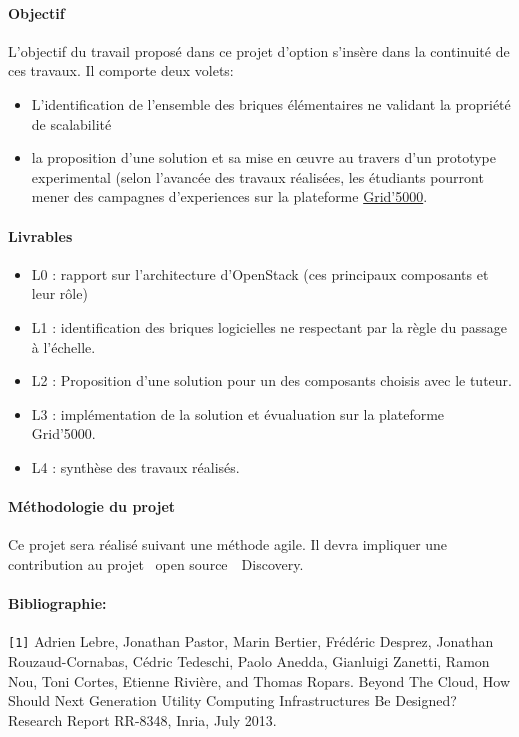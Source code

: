 \documentclass[a4paper,11pt]{article}
\begin{document}
\begin{note}
\paragraph*{Objectif\\}

  L'objectif du travail proposé dans ce projet d'option s'insère dans
  la continuité de ces travaux. Il comporte deux
  volets:
\begin{itemize}
\item L'identification de l'ensemble des briques élémentaires ne
  validant la propriété de scalabilité
\item la proposition d'une solution et sa mise en \oe uvre au travers
  d'un prototype experimental (selon l'avancée des travaux réalisées,
  les étudiants pourront mener des campagnes d'experiences sur la
  plateforme \href{Grid'5000}{Grid'5000}.
\end{itemize}

\paragraph*{Livrables\\}

\begin{itemize}
\item L0 : rapport sur l'architecture d'OpenStack (ces principaux
  composants et leur rôle)
\item L1 : identification des briques logicielles ne respectant par la
  règle du passage à l'échelle.
\item L2 : Proposition d'une solution pour un des composants choisis
  avec le tuteur.
\item L3 : implémentation de la solution et évualuation sur la
  plateforme Grid'5000.
\item L4 : synthèse des travaux réalisés.
\end{itemize}

\paragraph*{Méthodologie du projet\\}
Ce projet sera réalisé suivant une méthode agile. Il devra impliquer une
contribution au projet \og~open source~\fg\ Discovery.


\paragraph*{Bibliographie:\\}
%
\texttt{[1]} Adrien Lebre, Jonathan Pastor, Marin Bertier, Frédéric Desprez, Jonathan Rouzaud-Cornabas, Cédric Tedeschi, Paolo Anedda, Gianluigi Zanetti, Ramon Nou, Toni Cortes, Etienne Rivière, and Thomas Ropars. Beyond The Cloud, How Should Next Generation Utility Computing Infrastructures Be Designed? Research Report RR-8348, Inria, July 2013.\\

\end{note}
\end{document}

